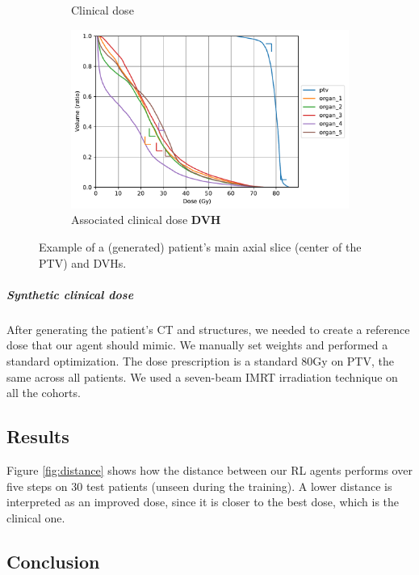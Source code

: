 \begin{figure}
\begin{subfigure}{0.48\linewidth}
		\caption{Clinical dose}
	\end{subfigure}
	\begin{subfigure}{\linewidth}
		\centering
		\includegraphics[width=0.8\linewidth]{AIME/dvh_example.pdf}
		\caption{Associated clinical dose \textbf{DVH}}
		\label{fig:clinical_dvh}
	\end{subfigure}
	\caption{Example of a (generated) patient's main axial slice (center of the PTV) and DVHs.}
\end{figure}

\subparagraph{Synthetic clinical dose}
After generating the patient's CT and structures, we needed to create a reference dose that our agent should mimic.
We manually set weights and performed a standard optimization.
The dose prescription is a standard 80Gy on PTV, the same across all patients.
We used a seven-beam IMRT irradiation technique on all the cohorts.

\subsection{Results}
Figure \ref{fig:distance} shows how the distance between our RL agents performs over five steps on 30 test patients (unseen during the training).
A lower distance is interpreted as an improved dose, since it is closer to the best dose, which is the clinical one.

\subsection{Conclusion}
%

